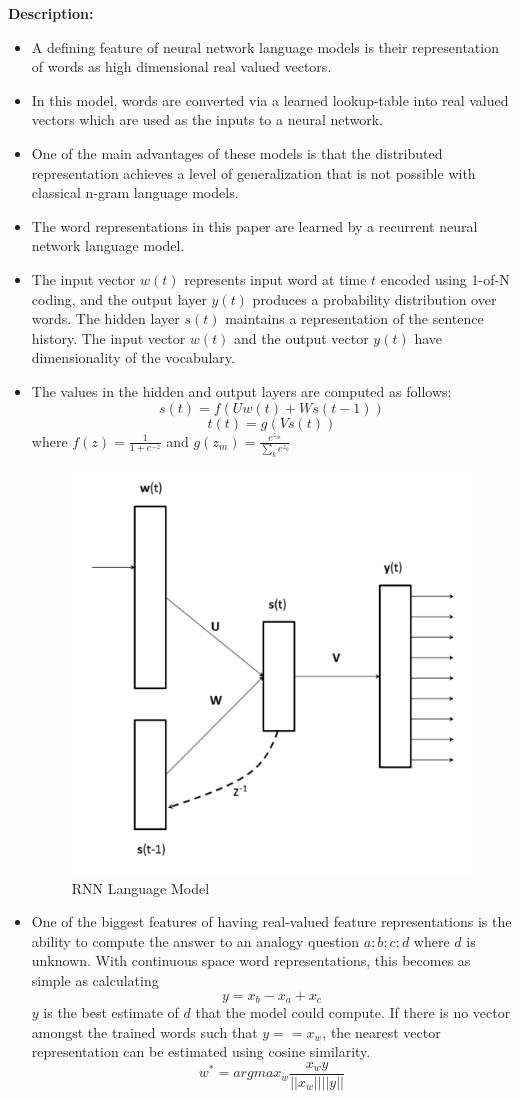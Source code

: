 \documentclass[11pt,a4paper]{article}
\begin{document}
  \textbf{Description:}
  \begin{itemize}
    \item
    A defining feature of neural network language models is their representation of words as high dimensional real valued vectors.
    \item
    In this model, words are converted via a learned lookup-table into real valued vectors which are used as the inputs to a neural network.
    \item
    One of the main advantages of these models is that the distributed representation achieves a level of generalization that is not possible with classical n-gram language models.
    \item
    The word representations in this paper are learned by a recurrent neural network language model.
    \item
    The input vector $w(t)$ represents input word at time $t$ encoded using 1-of-N coding, and the output layer $y(t)$ produces a probability distribution over words. The hidden layer $s(t)$ maintains a representation of the sentence history. The input vector $w(t)$ and the output vector $y(t)$ have dimensionality of the vocabulary.
    \item
    The values in the hidden and output layers are computed as follows:
    $$s(t) = f(Uw(t) + Ws(t-1))$$
    $$t(t) = g(Vs(t))$$
    where
    $f(z) = \frac{1}{1 + e^{-z}}$ and $g(z_m) = \frac{e^{z_m}}{\sum_k e^{z_k}} $
    \begin{figure}[ht]
      \centering
      \includegraphics[width=.4\textwidth]{rnn-lang-model}
      \caption{RNN Language Model}
      \label{fig:rnn-lang-model}
    \end{figure}
    \item
    One of the biggest features of having real-valued feature representations is the ability to compute the answer to an analogy question $a:b; c:d$ where $d$ is unknown. With continuous space word representations, this becomes as simple as calculating
    $$y = x_b - x_a + x_c$$
    $y$ is the best estimate of $d$ that the model could compute. If there is no vector amongst the trained words such that $y == x_w$, the nearest vector representation can be estimated using cosine similarity.
    $$w^* = argmax_w \frac{x_w y}{||x_w|| ||y||}$$
  \end{itemize}
\end{document}
